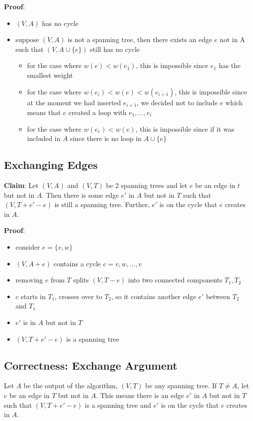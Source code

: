 \documentclass[11pt]{article}
\begin{document}
\textbf{Proof}:
\begin{itemize}
\item \((V, A)\) has no cycle
\item suppose \((V,A)\) is not a spanning tree, then there exists an edge \(e\) not in A such
that \((V, A \cup \{e\})\) still has no cycle
\begin{itemize}
\item for the case where \(w(e) < w(e_{1})\), this is impossible since \(e_{1}\) has the
smallest weight
\item for the case where \(w(e_{i}) < w(e) < w(e_{i+1})\), this is impossible since at
the moment we had inserted \(e_{i+1}\), we decided not to include \(e\) which means
that \(e\) created a loop with \(e_{1}, \dots, e_{i}\)
\item for the case where \(w(e_{r}) < w(e)\), this is impossible since if it was included
in \(A\) since there is no loop in \(A \cup \{e\}\)
\end{itemize}
\end{itemize}
\subsection{Exchanging Edges}
\label{sec:orgb06c5a2}
\textbf{Claim}: Let \((V, A)\) and \((V, T)\) be 2 spanning trees and let \(e\) be an edge in \(t\) but not in \(A\).
Then there is some edge \(e'\) in \(A\) but not in \(T\) such that \((V, T + e' - e)\) is still a spanning
tree. Further, \(e'\) is on the cycle that \(e\) creates in \(A\).

\textbf{Proof}:
\begin{itemize}
\item consider \(e = \{v, w\}\)
\item \((V, A + e)\) contains a cycle \(c = v, w, \dots, v\)
\item removing \(e\) from \(T\) splits \((V, T - e)\) into two connected components \(T_{1}, T_{2}\)
\item \(c\) starts in \(T_{1}\), crosses over to \(T_{2}\), so it contains another edge \(e'\) between \(T_{2}\)
and \(T_{1}\)
\item \(e'\) is in \(A\) but not in \(T\)
\item \((V, T + e' - e)\) is a spanning tree
\end{itemize}
\subsection{Correctness: Exchange Argument}
\label{sec:orga6015c6}
Let \(A\) be the output of the algorithm, \((V,T)\) be any spanning tree.
If \(T \ne A\), let \(e\) be an edge in \(T\) but not in \(A\). This means there is an edge \(e'\)
in \(A\) but not in \(T\) such that \((V, T + e' - e)\) is a spanning tree and \(e'\) is on the
cycle that \(e\) creates in \(A\).
\end{document}
